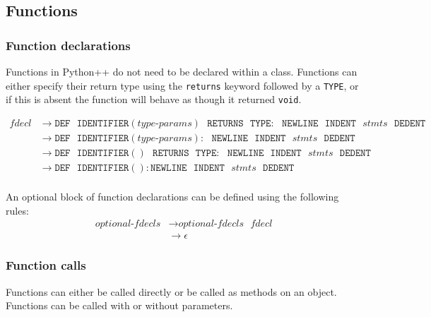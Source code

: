 \documentclass{article}
\begin{document}
\subsection{Functions}
\subsubsection{Function declarations}
Functions in Python++ do not need to be declared within a class. Functions can either specify their return type using the \texttt{returns} keyword followed by a \texttt{TYPE}, or if this is absent the function will behave as though it returned \texttt{void}.

\label{sec:fdecl}
\begin{align*}
    \textit{fdecl} &\to \texttt{DEF} \texttt{ } \texttt{IDENTIFIER}(\hyperref[sec:type-params]{\textit{type-params}}) \texttt{ } \texttt{RETURNS} \texttt{ } \texttt{TYPE}: \texttt{ } \texttt{NEWLINE} \texttt{ } \texttt{INDENT} \texttt{ } \hyperref[sec:stmts]{\textit{stmts}} \texttt{ } \texttt{DEDENT} \\
    &\to \texttt{DEF} \texttt{ } \texttt{IDENTIFIER}(\hyperref[sec:type-params]{\textit{type-params}}): \texttt{ } \texttt{NEWLINE} \texttt{ } \texttt{INDENT} \texttt{ } \hyperref[sec:stmts]{\textit{stmts}} \texttt{ } \texttt{DEDENT} \\
    &\to \texttt{DEF} \texttt{ } \texttt{IDENTIFIER}() \texttt{ } \texttt{RETURNS} \texttt{ } \texttt{TYPE}: \texttt{ } \texttt{NEWLINE} \texttt{ } \texttt{INDENT} \texttt{ } \hyperref[sec:stmts]{\textit{stmts}} \texttt{ } \texttt{DEDENT} \\
    &\to \texttt{DEF} \texttt{ } \texttt{IDENTIFIER}(): \texttt{NEWLINE} \texttt{ } \texttt{INDENT} \texttt{ } \hyperref[sec:stmts]{\textit{stmts}} \texttt{ } \texttt{DEDENT} \\
\end{align*}

An optional block of function declarations can be defined using the following rules:
\label{sec:optional-fdecls}
\begin{align*}
    \textit{optional-fdecls} &\to \hyperref[sec:optional-fdecls]{\textit{optional-fdecls}} \texttt{ } \hyperref[sec:fdecl]{\textit{fdecl}} \\
    &\to \epsilon
\end{align*}

\subsubsection{Function calls}
Functions can either be called directly or be called as methods on an object. Functions can be called with or without parameters.
\end{document}
